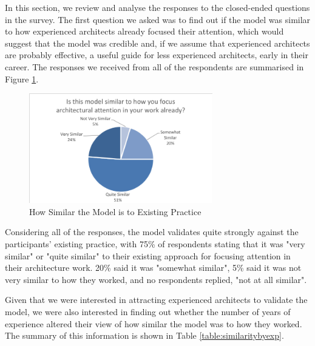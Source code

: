 In this section, we review and analyse the responses to the closed-ended questions in the survey.
The first question we asked was to find out if the model was similar to how experienced architects already focused their attention, which would suggest that the model was credible and, if we assume that experienced architects are probably effective, a useful guide for less experienced architects, early in their career.  The responses we received from all of the respondents are summarised in Figure \ref{figure:similarity}.
 
\begin{figure}
\centering
\includegraphics[width=8cm,trim={2 2 2 2},clip]{Figures/prioritisation-similarity}
\caption{How Similar the Model is to Existing Practice}
\label{figure:similarity}
\end{figure}

Considering all of the responses, the model validates quite strongly against the participants' existing practice, with 75\% of respondents stating that it was "very similar" or "quite similar" to their existing approach for focusing attention in their architecture work.  20\% said it was "somewhat similar", 5\% said it was not very similar to how they worked, and no respondents replied, "not at all similar".

Given that we were interested in attracting experienced architects to validate the model, we were also interested in finding out whether the number of years of experience altered their view of how similar the model was to how they worked.  The summary of this information is shown in Table \ref{table:similaritybyexp}.


